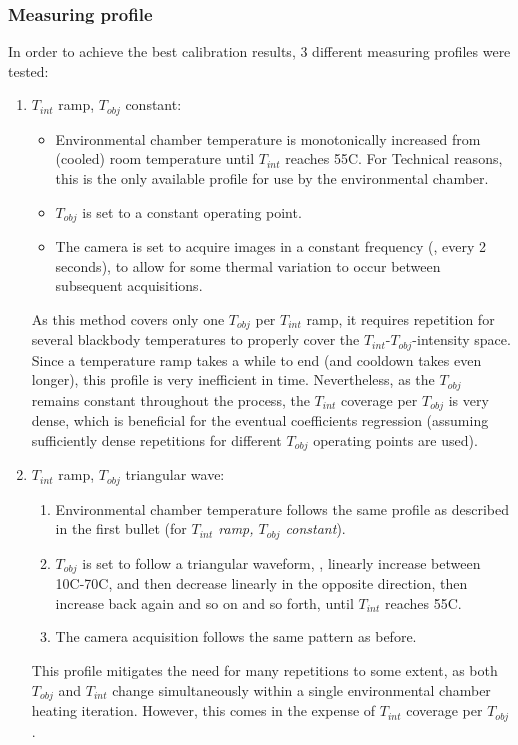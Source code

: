 \subsubsection{Measuring profile}
In order to achieve the best calibration results, 3 different measuring profiles were tested:
\begin{enumerate}
  \item $T_\mathit{int}$ ramp, $T_\mathit{obj}$ constant: 
  \begin{itemize}
    \item Environmental chamber temperature is monotonically increased from (cooled) room temperature until $T_\mathit{int}$ reaches 55C\textdegree.
    For Technical reasons, this is the only available profile for use by the environmental chamber.
    \item $T_\mathit{obj}$ is set to a constant operating point.
    \item The camera is set to acquire images in a constant frequency (\eg, every 2 seconds), to allow for some thermal variation to occur between subsequent acquisitions.
  \end{itemize}    
  As this method covers only one $T_\mathit{obj}$ per $T_\mathit{int}$ ramp, it requires repetition for several blackbody temperatures to properly cover the $T_\mathit{int}$-$T_\mathit{obj}$-intensity space.
  Since a temperature ramp takes a while to end (and cooldown takes even longer), this profile is very inefficient in time.
  Nevertheless, as the $T_\mathit{obj}$ remains constant throughout the process, the $T_\mathit{int}$ coverage per $T_\mathit{obj}$ is very dense, which is beneficial for the eventual coefficients regression (assuming sufficiently dense repetitions for different $T_\mathit{obj}$ operating points are used).

  \item $T_\mathit{int}$ ramp, $T_\mathit{obj}$ triangular wave:
  \begin{enumerate}
    \item Environmental chamber temperature follows the same profile as described in the first bullet (for \emph{$T_\mathit{int}$ ramp, $T_\mathit{obj}$ constant}).
    \item $T_\mathit{obj}$ is set to follow a triangular waveform, \ie, linearly increase between 10C\textdegree-70C\textdegree, and then decrease linearly in the opposite direction, then increase back again and so on and so forth, until $T_\mathit{int}$ reaches 55C\textdegree.
    \item The camera acquisition follows the same pattern as before.      
  \end{enumerate}
  This profile mitigates the need for many repetitions to some extent, as both $T_\mathit{obj}$ and $T_\mathit{int}$ change simultaneously within a single environmental chamber heating iteration.
  However, this comes in the expense of $T_\mathit{int}$ coverage per $T_\mathit{obj}$.


\end{enumerate}
